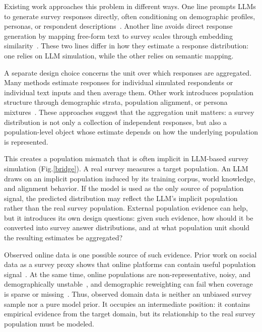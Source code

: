 \documentclass{article}
\begin{document}
Existing work approaches this problem in different ways.
One line prompts LLMs to generate survey responses directly,
often conditioning on demographic profiles, personas, or respondent
descriptions~\cite{aher2023using, argyle2023silicon, santurkar2023whose,
yang2024specializing}.
Another line avoids direct response generation by mapping free-form text
to survey scales through embedding similarity~\cite{maier2026llms}.
These two lines differ in how they estimate a response distribution:
one relies on LLM simulation, while the other relies on semantic mapping.

A separate design choice concerns the unit over which responses are
aggregated.
Many methods estimate responses for individual simulated respondents or
individual text inputs and then average them.
Other work introduces population structure through demographic strata,
population alignment, or persona mixtures~\cite{wang2024mixture,
hwang2023aligning}.
These approaches suggest that the aggregation unit matters:
a survey distribution is not only a collection of independent responses,
but also a population-level object whose estimate depends on how the
underlying population is represented.

This creates a population mismatch that is often implicit in
LLM-based survey simulation (Fig.\ref{bridge}).
A real survey measures a target population.
An LLM draws on an implicit population induced by its training corpus,
world knowledge, and alignment behavior.
If the model is used as the only source of population signal, the
predicted distribution may reflect the LLM's implicit population rather
than the real survey population.
External population evidence can help, but it introduces its own design
questions:
given such evidence, how should it be converted into survey answer
distributions, and at what population unit should the resulting estimates
be aggregated?

Observed online data is one possible source of such evidence.
Prior work on social data as a survey proxy shows that online platforms
can contain useful population signal~\cite{wang2015forecasting,
cerina2024ai}.
At the same time, online populations are non-representative, noisy, and
demographically unstable~\cite{diaz2016online}, and demographic
reweighting can fail when coverage is sparse or missing~\cite{sen2017total}.
Thus, observed domain data is neither an unbiased survey sample nor a
pure model prior.
It occupies an intermediate position: it contains empirical evidence
from the target domain, but its relationship to the real survey
population must be modeled.
\end{document}
